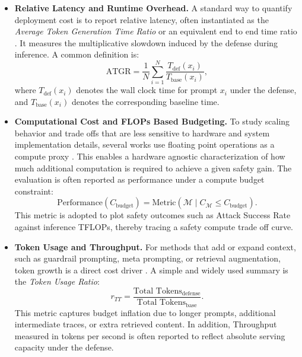 \begin{itemize}
    \item \textbf{Relative Latency and Runtime Overhead.}
    A standard way to quantify deployment cost is to report relative latency, often instantiated as the \textit{Average Token Generation Time Ratio} or an equivalent end to end time ratio \citep{Xu2024SafeDecodingDA, Liu2024AlignmentEnhancedDD, Li2024CleanGenMB, zhang2023patching}. It measures the multiplicative slowdown induced by the defense during inference. A common definition is:
    \[
    \text{ATGR} = \frac{1}{N} \sum_{i=1}^{N} \frac{T_{\text{def}}(x_i)}{T_{\text{base}}(x_i)},
    \]
    where $T_{\text{def}}(x_i)$ denotes the wall clock time for prompt $x_i$ under the defense, and $T_{\text{base}}(x_i)$ denotes the corresponding baseline time.

    \item \textbf{Computational Cost and FLOPs Based Budgeting.}
    To study scaling behavior and trade offs that are less sensitive to hardware and system implementation details, several works use floating point operations as a compute proxy \citep{qiu2025saffron, Lee2025SafeRouteAM}. This enables a hardware agnostic characterization of how much additional computation is required to achieve a given safety gain. The evaluation is often reported as performance under a compute budget constraint:
    \[
    \text{Performance}(C_{\text{budget}}) = \text{Metric}\!\left(\mathcal{M} \mid C_{\mathcal{M}} \le C_{\text{budget}}\right).
    \]
     This metric is adopted to plot safety outcomes such as Attack Success Rate against inference TFLOPs, thereby tracing a safety compute trade off curve.

    \item \textbf{Token Usage and Throughput.}
    For methods that add or expand context, such as guardrail prompting, meta prompting, or retrieval augmentation, token growth is a direct cost driver \citep{Jiang2023POSTERIA, shrestha2024fairrag, Zeng2024RootDS}. A simple and widely used summary is the \textit{Token Usage Ratio}:
    \[
    r_{TT} = \frac{\text{Total Tokens}_{\text{defense}}}{\text{Total Tokens}_{\text{base}}}.
    \]
    This metric captures budget inflation due to longer prompts, additional intermediate traces, or extra retrieved content. In addition, Throughput measured in tokens per second is often reported to reflect absolute serving capacity under the defense.
\end{itemize}
 